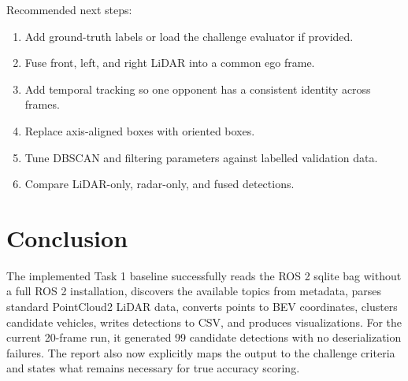 \documentclass[11pt,a4paper]{article}
\begin{document}
Recommended next steps:

\begin{enumerate}
  \item Add ground-truth labels or load the challenge evaluator if provided.
  \item Fuse front, left, and right LiDAR into a common ego frame.
  \item Add temporal tracking so one opponent has a consistent identity across
  frames.
  \item Replace axis-aligned boxes with oriented boxes.
  \item Tune DBSCAN and filtering parameters against labelled validation data.
  \item Compare LiDAR-only, radar-only, and fused detections.
\end{enumerate}

\section{Conclusion}

The implemented Task 1 baseline successfully reads the ROS 2 sqlite bag without
a full ROS 2 installation, discovers the available topics from metadata, parses
standard PointCloud2 LiDAR data, converts points to BEV coordinates, clusters
candidate vehicles, writes detections to CSV, and produces visualizations. For
the current 20-frame run, it generated 99 candidate detections with no
deserialization failures. The report also now explicitly maps the output to the
challenge criteria and states what remains necessary for true accuracy scoring.
\end{document}

